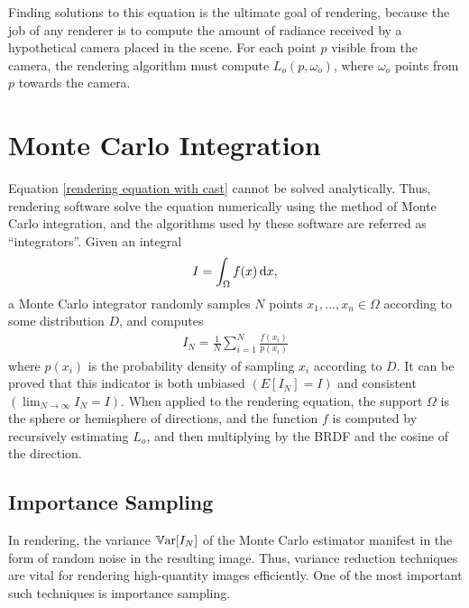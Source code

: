Finding solutions to this equation is the ultimate goal of rendering, because the job of any renderer is to compute the amount of radiance received by a hypothetical camera placed in the scene. For each point $p$ visible from the camera, the rendering algorithm must compute $L_o(p,\omega_o)$, where $\omega_o$ points from $p$ towards the camera. 

\section{Monte Carlo Integration}

Equation \ref{rendering equation with cast} cannot be solved analytically. Thus, rendering software solve the equation numerically using the method of Monte Carlo integration, and the algorithms used by these software are referred as ``integrators''. Given an integral
\begin{align*}
    I = \int_\Omega f(x) \,\mathrm{d} x,
\end{align*}
a Monte Carlo integrator randomly samples $N$ points $x_1,...,x_n\in \Omega$ according to some distribution $D$, and computes
\begin{align}
    I_N = \frac{1}{N}\sum_{i=1}^{N} \frac{f(x_i)}{p(x_i)}
    \label{monte carlo estimator}
\end{align}
where $p(x_i)$ is the probability density of sampling $x_i$ according to $D$. It can be proved that this indicator is both unbiased $(E[I_N]=I)$ and consistent $(\lim_{N\to\infty}I_N = I)$. When applied to the rendering equation, the support $\Omega$ is the sphere or hemisphere of directions, and the function $f$ is computed by recursively estimating $L_o$, and then multiplying by the BRDF and the cosine of the direction.

\subsection{Importance Sampling}
\label{subsection IS}
In rendering, the variance $\mathbb{V}\text{ar}[I_N]$ of the Monte Carlo estimator manifest in the form of random noise in the resulting image. Thus, variance reduction techniques are vital for rendering high-quantity images efficiently. One of the most important such techniques is importance sampling.

